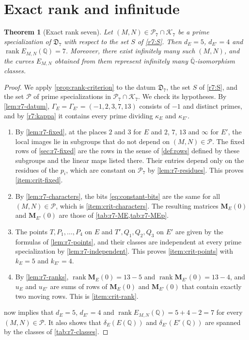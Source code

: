 \documentclass[12pt,oneside,openany]{book}
\theoremstyle{definition}
\theoremstyle{plain}
\numberwithin{equation}{chapter}
\theoremstyle{plain}
\newtheorem{theorem}{Theorem}[chapter]
\theoremstyle{definition}
\theoremstyle{remark}
\newcommand{\Q}{\mathbb Q}
\newcommand{\Qbar}{\overline{\mathbb Q}}
\DeclareMathOperator{\rk}{rank}
\newcommand{\datum}{\mathfrak D}
\newcommand{\cP}{\mathcal P}
\newcommand{\cK}{\mathcal K}
\begin{document}
\section{Exact rank and infinitude}\label{sec:r7-theorem}

\begin{theorem}[Exact rank seven]\label{thm:r7}
Let $(M,N)\in\cP_7\cap\cK_7$ be a prime specialization of $\datum_7$
with respect to the set $S$ of \eqref{r7:S}. Then $d_E=5$, $d_{E'}=4$ and
$\rk E_{M,N}(\Q)=7$. Moreover, there exist infinitely many such $(M,N)$,
and the curves $E_{M,N}$ obtained from them represent infinitely many
$\Qbar$-isomorphism classes.
\end{theorem}

\begin{proof}
We apply \cref{prop:rank-criterion} to the datum $\datum_7$, the set $S$ of
\eqref{r7:S}, and the set $\cP$ of prime specializations in
$\cP_7\cap\cK_7$. We check its hypotheses.
By \cref{lem:r7-datum}, $\Gamma_E=\Gamma_{E'}=(-1,2,3,7,13)$ consists of
$-1$ and distinct primes, and by \eqref{r7:kappa} it contains every prime
dividing $\kappa_E$ and $\kappa_{E'}$.
\begin{enumerate}[label=(\roman*)]
\item By \cref{lem:r7-fixed}, at the places $2$ and $3$ for $E$ and $2$,
$7$, $13$ and $\infty$ for $E'$, the local images lie in subgroups that do
not depend on $(M,N)\in\cP$. The fixed rows of \cref{sec:r7-fixed} are the rows
in the sense of \cref{def:rows} defined by these subgroups and the linear
maps listed there. Their entries depend only on the residues of the $p_i$,
which are constant on $\cP_7$ by \cref{lem:r7-residues}. This proves
\ref{item:crit-fixed}.
\item By \cref{lem:r7-characters}, the bits \eqref{eq:constant-bits} are
the same for all $(M,N)\in\cP$, which is \ref{item:crit-characters}. The
resulting matrices $\mathbf M_E(0)$ and $\mathbf M_{E'}(0)$ are those of
\cref{tab:r7-ME,tab:r7-MEp}.
\item The points $T,P_1,\dots,P_4$ on $E$ and $T',Q_1,Q_2,Q_3$ on $E'$ are
given by the formulas of \cref{lem:r7-points}, and their classes are
independent at every prime specialization by \cref{lem:r7-independent}.
This proves \ref{item:crit-points} with $k_E=5$ and $k_{E'}=4$.
\item By \cref{lem:r7-ranks}, $\rk\mathbf M_E(0)=13-5$ and
$\rk\mathbf M_{E'}(0)=13-4$, and $u_E$ and $u_{E'}$ are sums of rows of
$\mathbf M_E(0)$ and $\mathbf M_{E'}(0)$ that contain exactly two moving
rows. This is \ref{item:crit-rank}.
\end{enumerate}
 now implies that $d_E=5$, $d_{E'}=4$ and
$\rk E_{M,N}(\Q)=5+4-2=7$ for every $(M,N)\in\cP$. It also shows that
$\delta_E(E(\Q))$ and $\delta_{E'}(E'(\Q))$ are spanned by the classes of
\cref{tab:r7-classes}.


\end{proof}
\end{document}
